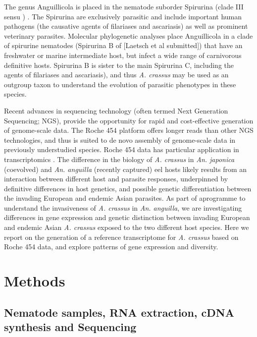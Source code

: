\documentclass[10pt]{bmc_article}
\newenvironment{bmcformat}{\begin{raggedright}\baselineskip20pt\sloppy\setboolean{publ}{false}}{\end{raggedright}\baselineskip20pt\sloppy}
\begin{document}
\begin{bmcformat}
The genus Anguillicola is placed in the nematode suborder Spirurina
(clade III sensu \cite{blaxter_molecular_1998})
\cite{nadler_molecular_2007, wijov_evolutionary_2006}. The Spirurina
are exclusively parasitic and include important human pathogens (the
causative agents of filariases and ascariasis) as well as prominent
veterinary parasites. Molecular phylogenetic analyses place
Anguillicola in a clade of spirurine nematodes (Spirurina B of
[Laetsch et al submitted]) that have an freshwater or marine
intermediate host, but infect a wide range of carnivorous definitive
hosts. Spirurina B is sister to the main Spirurina C, including the
agents of filariases and ascariasis), and thus \textit{A. crassus} may be used
as an outgroup taxon to understand the evolution of parasitic
phenotypes in these species.

Recent advances in sequencing technology (often termed Next Generation
Sequencing; NGS), provide the opportunity for rapid and cost-effective
generation of genome-scale data. The Roche 454 platform
\cite{pmid16056220} offers longer reads than other NGS technologies,
and thus is suited to de novo assembly of genome-scale data in
previously understudied species. Roche 454 data has particular
application in transcriptomics \cite{pmid20950480}. The difference in
the biology of \textit{A. crassus} in \textit{An. japonica} (coevolved) and \textit{An. anguilla}
(recently captured) eel hosts likely results from an interaction
between different host and parasite responses, underpinned by
definitive differences in host genetics, and possible genetic
differentiation between the invading European and endemic Asian
parasites. As part of aprogramme to understand the invasiveness of
\textit{A. crassus} in \textit{An. anguilla}, we are investigating differences in gene
expression and genetic distinction between invading European and
endemic Asian \textit{A. crassus} exposed to the two different host
species. Here we report on the generation of a reference transcriptome
for \textit{A. crassus} based on Roche 454 data, and explore patterns of gene
expression and diversity.


\section*{Methods}


\subsection*{Nematode samples, RNA extraction, cDNA synthesis and Sequencing}


\end{bmcformat}
\end{document}
